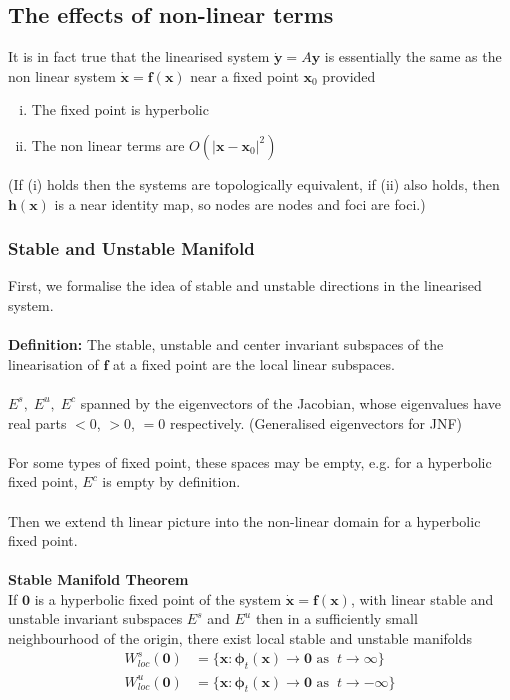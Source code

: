 \documentclass{article}
\newcommand{\bp}{\bm{\phi}}   %
\begin{document}
\subsection{The effects of non-linear terms}
It is in fact true that the linearised system $\dot{\bm{y}} = A \bm{y}$
is essentially the same as the non linear system $\dot{\bm{x}} = \bm{f}(\bm{x})$
near a fixed point $\bm{x}_0$ provided
\begin{enumerate}[(i)]
\item The fixed point is hyperbolic
\item The non linear terms are $O( |\bm{x} - \bm{x}_0|^2)$
\end{enumerate}
(If (i) holds then the systems are topologically equivalent, if (ii) also holds,
then $\bm{h}(\bm{x})$ is a near identity map, so nodes are nodes and foci are
foci.)
\subsubsection{Stable and Unstable Manifold}
First, we formalise the idea of stable and unstable directions in the linearised
system.
\\
\\
\textbf{Definition:} The stable, unstable and center invariant subspaces of the
linearisation of $\bm{f}$ at a fixed point are the local linear subspaces.
\\
\\
$E^s, \; E^u, \; E^c$ spanned by the eigenvectors of the Jacobian, whose 
eigenvalues have real parts $<0$, $ >0$,  $=0$ respectively. (Generalised
eigenvectors for JNF)
\\
\\
For some types of fixed point, these spaces may be empty, e.g. for a hyperbolic
fixed point, $E^c$ is empty by definition.
\\
\\
Then we extend th linear picture into the non-linear domain for a hyperbolic
fixed point.
\\
\\
\textbf{Stable Manifold Theorem}
\\
If $\bm{0}$ is a hyperbolic fixed point of the system $\dot{\bm{x}} = \bm{f}(\bm{x})$,
with linear stable and unstable invariant subspaces $E^s$ and $E^u$ then in a 
sufficiently small neighbourhood of the origin, there exist local stable and
unstable manifolds
\begin{align*}
W^s_{loc}(\bm{0}) &= \{ \bm{x} : \bp_t(\bm{x}) \to \bm{0} \mbox{ as } \
t \to \infty \} \\
W^u_{loc}(\bm{0}) &= \{ \bm{x} : \bp_t(\bm{x}) \to \bm{0} \mbox{ as } \
t \to -\infty \} 
\end{align*}
\end{document}
